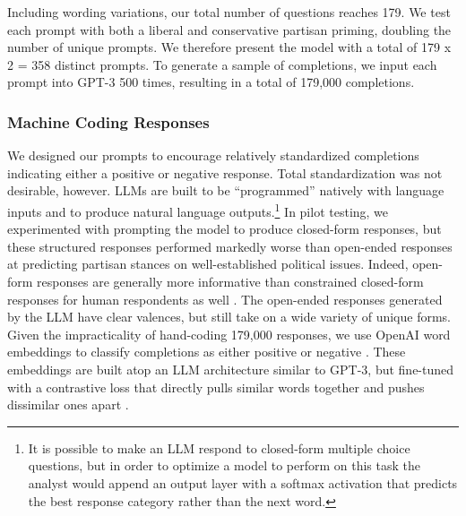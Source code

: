 \documentclass{article}
\begin{document}
Including wording variations, our total number of questions reaches 179.
We test each prompt with both a liberal and conservative partisan
priming, doubling the number of unique prompts. We therefore present the
model with a total of 179 x 2 = 358 distinct prompts. To generate a
sample of completions, we input each prompt into GPT-3 500 times,
resulting in a total of 179,000 completions.

\subsubsection*{Machine Coding Responses}

We designed our prompts to encourage relatively standardized completions
indicating either a positive or negative response. Total standardization
was not desirable, however. LLMs are built to be ``programmed'' natively
with language inputs and to produce natural language outputs.\footnote{It
  is possible to make an LLM respond to closed-form multiple choice
  questions, but in order to optimize a model to perform on this task
  the analyst would append an output layer with a softmax activation
  that predicts the best response category rather than the next word.}
In pilot testing, we experimented with prompting the model to produce
closed-form responses, but these structured responses performed markedly
worse than open-ended responses at predicting partisan stances on
well-established political issues. Indeed, open-form responses are
generally more informative than constrained closed-form responses for
human respondents as well
\parencite{Tourangeau2000-tk, Willis2004-lr}. The open-ended responses generated by the
LLM have clear valences, but still take on a wide variety of unique
forms. Given the impracticality of hand-coding 179,000 responses, we use
OpenAI word embeddings to classify completions as either positive or
negative \parencite{Neelakantan2022-yd}. These embeddings are built atop an LLM architecture similar to
GPT-3, but fine-tuned with a contrastive loss that directly pulls
similar words together and pushes dissimilar ones apart
\parencite{Neelakantan2022-yd}.
\end{document}
